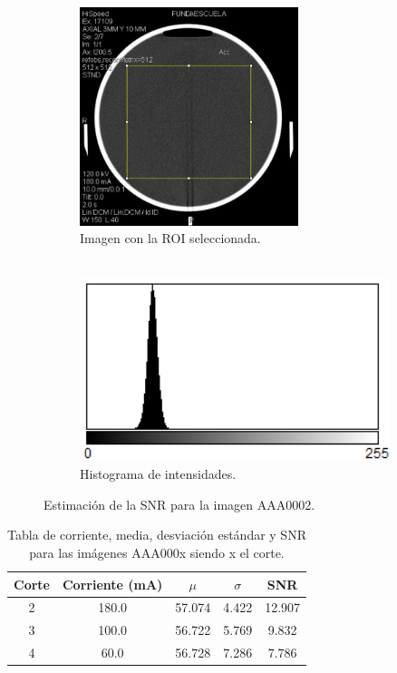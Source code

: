 \documentclass[letterpaper,12pt]{article}
\theoremstyle{plain}
\begin{document}
\begin{figure}[h]
    \centering
         \begin{subfigure}[h]{0.49\linewidth}
            \centering
            \includegraphics[width=0.7\textwidth]{Figuras/roi_corte2.png}
            \caption{Imagen con la ROI seleccionada. \\
            $~$} 
         \end{subfigure}
         \begin{subfigure}[h]{0.49\linewidth}
            \centering
            \includegraphics[width=\textwidth]{Figuras/hist_corte2.png}
            \caption{Histograma de intensidades.}
         \end{subfigure}
    \caption{Estimación de la SNR para la imagen AAA0002.}
    \label{fig:SNR}
\end{figure}

\begin{table}[h]
    \centering
    \begin{tabular}{c||c|c|c|c}
    \hline
    Corte & Corriente (mA) & $\mu$     & $\sigma$ & SNR \\ \hline
    2     & 180.0          & 57.074 & 4.422 & 12.907   \\ \hline
    3     & 100.0          & 56.722 & 5.769 & 9.832   \\ \hline
    4     & 60.0           & 56.728 & 7.286 & 7.786   \\ \hline
    \end{tabular}
    \caption{Tabla de corriente, media, desviación estándar y SNR para las imágenes AAA000x siendo x el corte.} \label{tab:SNR}
\end{table}
\end{document}
